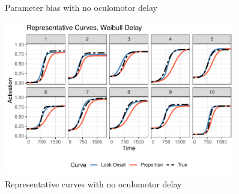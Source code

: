 \documentclass{beamer}
\begin{document}
\begin{frame}
\begin{figure}[H]
\centering
\caption{Parameter bias with no oculomotor delay}
\label{fig:par_bias_no_delay}
\end{figure}
\end{frame}



\begin{frame}
\begin{figure}[H]
\centering
\includegraphics[width=0.9\textwidth]{rep_curves_weibull_delay.pdf}
\caption{Representative curves with no oculomotor delay}
\label{fig:rep_curves_no_delay}
\end{figure}
\end{frame}
\end{document}
